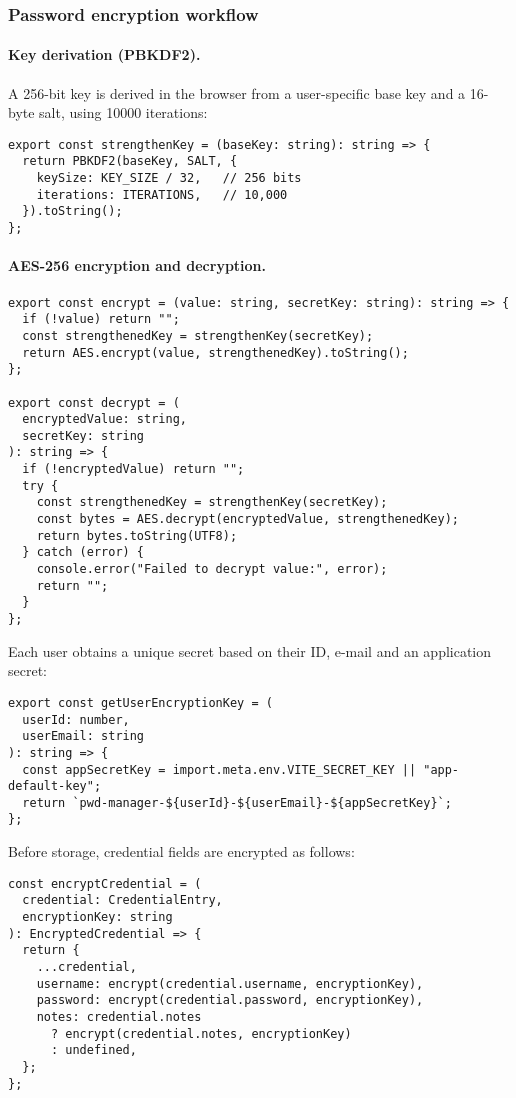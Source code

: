 \subsubsection{Password encryption workflow}

\paragraph{Key derivation (PBKDF2).}
A 256-bit key is derived in the browser from a user-specific base key and a 16-byte salt, using 10000 iterations:

\begin{verbatim}
export const strengthenKey = (baseKey: string): string => {
  return PBKDF2(baseKey, SALT, {
    keySize: KEY_SIZE / 32,   // 256 bits
    iterations: ITERATIONS,   // 10,000
  }).toString();
};
\end{verbatim}

\paragraph{AES-256 encryption and decryption.}

\begin{verbatim}
export const encrypt = (value: string, secretKey: string): string => {
  if (!value) return "";
  const strengthenedKey = strengthenKey(secretKey);
  return AES.encrypt(value, strengthenedKey).toString();
};

export const decrypt = (
  encryptedValue: string,
  secretKey: string
): string => {
  if (!encryptedValue) return "";
  try {
    const strengthenedKey = strengthenKey(secretKey);
    const bytes = AES.decrypt(encryptedValue, strengthenedKey);
    return bytes.toString(UTF8);
  } catch (error) {
    console.error("Failed to decrypt value:", error);
    return "";
  }
};
\end{verbatim}

Each user obtains a unique secret based on their ID, e-mail and an application secret:

\begin{verbatim}
export const getUserEncryptionKey = (
  userId: number,
  userEmail: string
): string => {
  const appSecretKey = import.meta.env.VITE_SECRET_KEY || "app-default-key";
  return `pwd-manager-${userId}-${userEmail}-${appSecretKey}`;
};
\end{verbatim}

Before storage, credential fields are encrypted as follows:

\begin{verbatim}
const encryptCredential = (
  credential: CredentialEntry,
  encryptionKey: string
): EncryptedCredential => {
  return {
    ...credential,
    username: encrypt(credential.username, encryptionKey),
    password: encrypt(credential.password, encryptionKey),
    notes: credential.notes
      ? encrypt(credential.notes, encryptionKey)
      : undefined,
  };
};
\end{verbatim}

